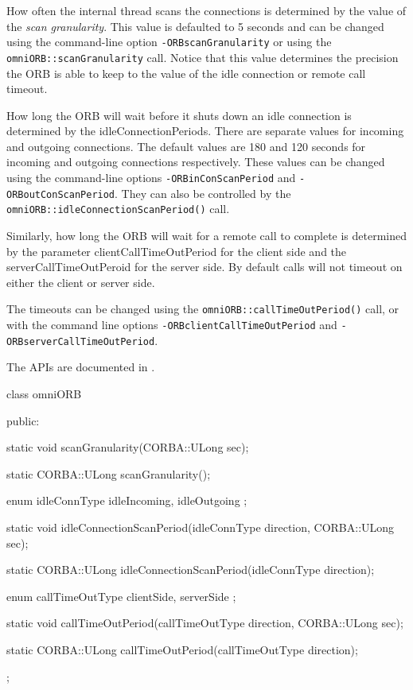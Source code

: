 \documentclass[11pt,twoside,a4paper]{book}
\newcommand{\code}[1]{\texttt{#1}}
\newcommand{\op}[1]{\texttt{#1()}}
\newcommand{\file}{\begingroup \urlstyle{tt}\Url}
\newcommand{\dsc}{\discretionary{}{}{}}
\begin{document}
How often the internal thread scans the connections is determined by
the value of the \emph{scan granularity}. This value is defaulted to 5
seconds and can be changed using the command-line option
\texttt{-ORBscanGranularity} or using the
\code{omniORB::\dsc{}scanGranularity} call. Notice that this value
determines the precision the ORB is able to keep to the value of the
idle connection or remote call timeout.

How long the ORB will wait before it shuts down an idle connection is
determined by the idleConnectionPeriods. There are separate values for
incoming and outgoing connections. The default values are 180 and 120
seconds for incoming and outgoing connections respectively. These
values can be changed using the command-line options
\texttt{-ORBinConScanPeriod} and \texttt{-ORBoutConScanPeriod}. They
can also be controlled by the
\op{omniORB::idleConnectionScanPeriod} call.

Similarly, how long the ORB will wait for a remote call to complete is
determined by the parameter clientCallTimeOutPeriod for the client
side and the serverCallTimeOutPeroid for the server side. By default
calls will not timeout on either the client or server side.

The timeouts can be changed using the
\op{omniORB::callTimeOutPeriod} call, or with the command line
options \texttt{-ORBclientCallTimeOutPeriod} and
\texttt{-ORBserverCallTimeOutPeriod}.

The APIs are documented in \file{include/omniORB3/omniORB.h}.


\begin{cxxlisting}
class omniORB {
public:

  static void scanGranularity(CORBA::ULong sec);

  static CORBA::ULong scanGranularity();

  enum   idleConnType { idleIncoming, idleOutgoing };

  static void idleConnectionScanPeriod(idleConnType direction, CORBA::ULong sec);

  static CORBA::ULong idleConnectionScanPeriod(idleConnType direction);

  enum   callTimeOutType { clientSide, serverSide };

  static void callTimeOutPeriod(callTimeOutType direction, CORBA::ULong sec);

  static CORBA::ULong callTimeOutPeriod(callTimeOutType direction);
};
\end{cxxlisting}
\end{document}

